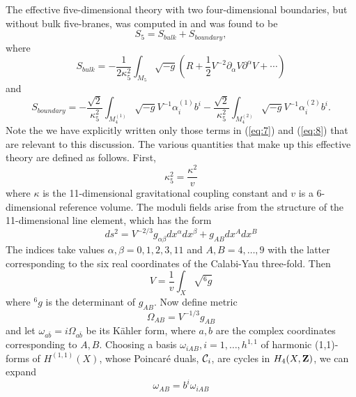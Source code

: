 \documentclass[a4paper,12pt]{article}
\numberwithin{equation}{section}
\theoremstyle{plain}
\begin{document}
The effective five-dimensional theory with two four-dimensional
boundaries, but without bulk five-branes, was computed in \cite{BW1B} 
and was found to be
%
\begin{equation}
S_{5}=S_{bulk}+S_{boundary},
\label{eq:6}
\end{equation}
%
where
%
\begin{equation}
S_{bulk}=-\frac{1}{2\kappa_{5}^{2}}\int_{M_{5}}{\sqrt{-g}(R+\frac{1}{2}
V^{-2}\partial_{\alpha}V\partial^{\alpha}V+\cdots)}
\label{eq:7}
\end{equation}
%
and
%
\begin{equation}
S_{boundary}=-\frac{\sqrt{2}}{\kappa_{5}^{2}}\int_{M_{4}^{(1)}}{\sqrt{-g}V^{-1}
\alpha_{i}^{(1)}b^{i}} - \frac{\sqrt{2}}{\kappa_{5}^{2}}\int_{M_{4}^{(2)}}
{\sqrt{-g}V^{-1}\alpha_{i}^{(2)}b^{i}}.
\label{eq:8}
\end{equation}
%
Note the we have explicitly written only those terms in (\ref{eq:7}) and
(\ref{eq:8}) that 
are relevant to this discussion. The various quantities that make up this
effective theory are defined as follows. First,
%
\begin{equation}
\kappa_{5}^{2}=\frac{\kappa^{2}}{v}
\label{eq:9}
\end{equation}
%
where $\kappa$ is the 11-dimensional gravitational coupling constant and $v$ is a
6-dimensional reference volume. The moduli fields arise from the structure of
the 11-dimensional line element, which has the form
%
\begin{equation}
ds^{2}=V^{-2/3}g_{\alpha\beta}dx^{\alpha}dx^{\beta}+g_{AB}dx^{A}dx^{B}
\label{eq:10}
\end{equation}
%
The indices take values $\alpha,\beta=0,1,2,3,11$ and $A,B=4,\dots,9$ 
with the
latter corresponding to the six real 
coordinates of the Calabi-Yau three-fold. Then
%
\begin{equation}
V=\frac{1}{v}\int_{X}{\sqrt{^{6}g}}
\label{eq:11}
\end{equation}
%
where $^{6}g$ is the determinant of $g_{AB}$. Now define metric
%
\begin{equation}
\Omega_{AB}=V^{-1/3}g_{AB}
\label{eq:12}
\end{equation}
%
and let $\omega_{a \bar{b}}=i\Omega_{a \bar{b}}$ be its K\"{a}hler form, where
$a,b$ are the complex coordinates corresponding to $A,B$.
Choosing a basis $\omega_{iAB}, i=1,\dots,h^{1,1}$ of harmonic (1,1)-forms 
of $H^{(1,1)}(X)$, whose Poincar\'e duals, ${\cal{C}}_{i}$, 
are cycles in $H_{4}(X,{\bf Z \rm})$, we can expand
%
\begin{equation}
\omega_{AB}= b^{i}\omega_{iAB}
\label{eq:13}
\end{equation}
\end{document}

